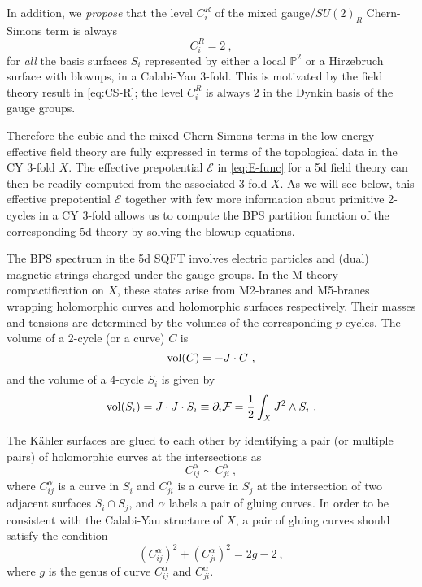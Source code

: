 In addition, we {\it propose} that the level $C^R_i$ of the mixed gauge/$SU(2)_R$ Chern-Simons term is always
\begin{equation}
	C_i^R = 2 \ ,
\end{equation}
for {\it all} the basis surfaces $S_i$ represented by either a local $\mathbb{P}^2$ or a Hirzebruch surface with blowups, in a Calabi-Yau 3-fold. This is motivated by the field theory result in \eqref{eq:CS-R}; the level $C^R_i$ is always $2$ in the Dynkin basis of the gauge groups.

Therefore the cubic and the mixed Chern-Simons terms in the low-energy effective field theory are fully expressed in terms of the topological data in the CY $3$-fold $X$. The effective prepotential $\mathcal{E}$ in \eqref{eq:E-func} for a 5d field theory can then be readily computed from the associated 3-fold $X$. As we will see below, this effective prepotential $\mathcal{E}$ together with few more information about primitive 2-cycles in a CY $3$-fold allows us to compute the BPS partition function of the corresponding 5d theory by solving the blowup equations.

The BPS spectrum in the 5d SQFT involves electric particles and (dual) magnetic strings charged under the gauge groups. In the M-theory compactification on $X$, these states arise from M2-branes and M5-branes wrapping holomorphic curves and holomorphic surfaces respectively. Their masses and tensions are determined by the volumes of the corresponding $p$-cycles. The volume of a 2-cycle (or a curve) $C$ is
\begin{equation}
	{\rm vol}(C) = -J\cdot C \ , 
\end{equation}
and the volume of a 4-cycle $S_i$ is given by
\begin{equation}
	{\rm vol}(S_i) = J\cdot J\cdot S_i \equiv \partial_i\mathcal{F}= \frac{1}{2}\int_X J^2\wedge S_i \ .
\end{equation}

The K\"ahler surfaces are glued to each other by identifying a pair (or multiple pairs) of holomorphic curves at the intersections as
\begin{equation}
	C_{ij}^\alpha \sim C_{ji}^\alpha \ ,
\end{equation}
where $C_{ij}^\alpha$ is a curve in $S_i$ and $C_{ji}^\alpha$ is a curve in $S_j$ at the intersection of two adjacent surfaces $S_i\cap S_j$, and $\alpha$ labels a pair of gluing curves. In order to be consistent with the Calabi-Yau structure of $X$, a pair of gluing curves should satisfy the condition
\begin{equation}\label{eq:CY-cond}
	(C^\alpha_{ij})^2 + (C^\alpha_{ji})^2 = 2g-2 \ ,
\end{equation} 
where $g$ is the genus of curve $C_{ij}^\alpha$ and $C_{ji}^\alpha$. 


